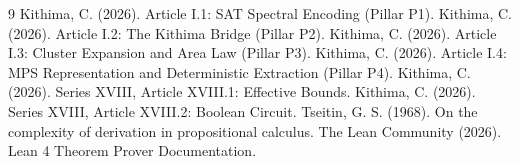 \documentclass[11pt,a4paper]{article}
\begin{document}

\begin{thebibliography}{9}
  Kithima, C. (2026). Article I.1: SAT Spectral Encoding (Pillar P1).
  Kithima, C. (2026). Article I.2: The Kithima Bridge (Pillar P2).
  Kithima, C. (2026). Article I.3: Cluster Expansion and Area Law (Pillar P3).
  Kithima, C. (2026). Article I.4: MPS Representation and Deterministic Extraction (Pillar P4).
  Kithima, C. (2026). Series XVIII, Article XVIII.1: Effective Bounds.
  Kithima, C. (2026). Series XVIII, Article XVIII.2: Boolean Circuit.
  Tseitin, G. S. (1968). On the complexity of derivation in propositional calculus.
  The Lean Community (2026). Lean 4 Theorem Prover Documentation.
\end{thebibliography}
\end{document}
